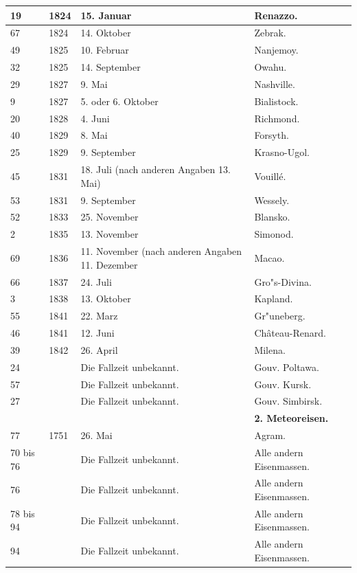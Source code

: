 \documentclass[a4paper, 11pt, oneside, polutonikogreek, german]{article}
\begin{document}
\begin{center}
\begin{longtable}{|p{6mm}|p{9mm}|p{60mm}|p{27mm}|}
        19 & 1824 & 15. Januar & Renazzo. \\ \hline
        67 & 1824 & 14. Oktober & Zebrak. \\ \hline
        49 & 1825 & 10. Februar & Nanjemoy. \\ \hline
        32 & 1825 & 14. September & Owahu. \\ \hline
        29 & 1827 & 9. Mai & Nashville. \\ \hline
        9 & 1827 & 5. oder 6. Oktober & Bialistock. \\ \hline
        20 & 1828 & 4. Juni & Richmond. \\ \hline
        40 & 1829 & 8. Mai & Forsyth. \\ \hline
        25 & 1829 & 9. September & Krasno-Ugol. \\ \hline
        45 & 1831 & 18. Juli (nach anderen Angaben 13. Mai) & Vouillé. \\ \hline
        53 & 1831 & 9. September & Wessely. \\ \hline
        52 & 1833 & 25. November & Blansko. \\ \hline
        2 & 1835 & 13. November & Simonod. \\ \hline
        69 & 1836 & 11. November (nach anderen Angaben 11. Dezember & Macao. \\ \hline
        66 & 1837 & 24. Juli & Gro"s-Divina. \\ \hline
        3 & 1838 & 13. Oktober & Kapland. \\ \hline
        55 & 1841 & 22. Marz & Gr"uneberg. \\ \hline
        46 & 1841 & 12. Juni & Château-Renard. \\ \hline
        39 & 1842 & 26. April & Milena. \\ \hline
        24 & ~ & Die Fallzeit unbekannt. & Gouv. Poltawa. \\ \hline
        57 & ~ & Die Fallzeit unbekannt. & Gouv. Kursk. \\ \hline
        27 & ~ & Die Fallzeit unbekannt. & Gouv. Simbirsk. \\ \hline
        ~ & ~ & ~ & \textbf{2. Meteoreisen.} \\ \hline
        77 & 1751 & 26. Mai & Agram. \\ \hline
        70 bis 76 & ~ & Die Fallzeit unbekannt. & Alle andern Eisenmassen. \\ \hline
        76 & ~ & Die Fallzeit unbekannt. & Alle andern Eisenmassen. \\ \hline
        78 bis 94 & ~ & Die Fallzeit unbekannt. & Alle andern Eisenmassen. \\ \hline
        94 & ~ & Die Fallzeit unbekannt. & Alle andern Eisenmassen. \\ \hline
    \end{longtable}
\end{center}
\clearpage
\end{document}
